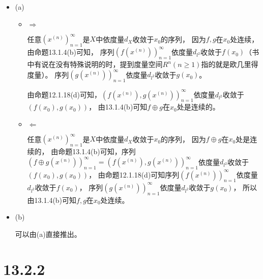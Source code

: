 \documentclass{article}
\begin{document}
\begin{itemize}
  \item (a)

        \begin{itemize}
          \item $\Rightarrow$

                任意$(x^{(n)})_{n = 1}^\infty$是$X$中依度量$d_X$收敛于$x_0$的序列，
                因为$f,g$在$x_0$处连续，由命题13.1.4(b)可知，
                序列$(f(x^{(n)}))_{n = 1}^\infty$依度量$d_{l^2}$收敛于$f(x_0)$（书中有说在没有特殊说明的时，提到度量空间$R^n(n \geq 1)$指的就是欧几里得度量）。
                序列$(g(x^{(n)}))_{n = 1}^\infty$依度量$d_{l^2}$收敛于$g(x_0)$。

                由命题12.1.18(d)可知，$(f(x^{(n)}), g(x^{(n)}))_{n = 1}^\infty$依度量$d_{l^2}$收敛于$(f(x_0),g(x_0))$，
                由13.1.4(b)可知$f \oplus g$在$x_0$处是连续的。

          \item $\Leftarrow$

                任意$(x^{(n)})_{n = 1}^\infty$是$X$中依度量$d_X$收敛于$x_0$的序列，
                因为$f \oplus g$在$x_0$处是连续的，
                由命题13.1.4(b)可知，序列$(f \oplus g(x^{(n)}))_{n = 1}^\infty = (f(x^{(n)}), g(x^{(n)}))_{n = 1}^\infty$依度量$d_{l^2}$收敛于$(f(x_0),g(x_0))$，
                由命题12.1.18(d)可知序列$(f(x^{(n)}))_{n = 1}^\infty$依度量$d_{l^2}$收敛于$f(x_0)$，
                序列$(g(x^{(n)}))_{n = 1}^\infty$依度量$d_{l^2}$收敛于$g(x_0)$，
                所以由13.1.4(b)可知$f,g$在$x_0$处连续。


        \end{itemize}

  \item (b)

        可以由(a)直接推出。
\end{itemize}

\section*{13.2.2}
\end{document}
